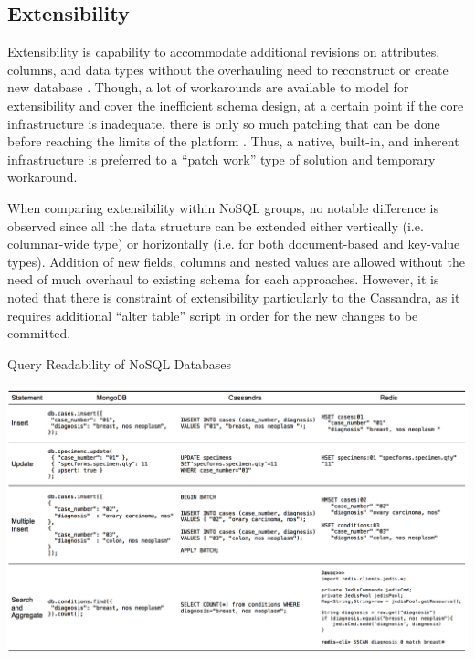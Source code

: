 \documentclass[5p]{elsarticle}
\begin{document}
\subsection{Extensibility}
Extensibility is capability to accommodate additional revisions on attributes, columns, and data types 
without the overhauling need to reconstruct or create new database \cite{S.Wang2013268}. 
Though, a lot of workarounds are available to model for extensibility and cover the inefficient schema design, 
at a certain point if the core infrastructure is inadequate, there is only so much patching that can be done before reaching the limits of the platform \cite{N.Ramachandran2016}.
Thus, a native, built-in, and inherent infrastructure is preferred to a “patch work” type of solution and temporary workaround.

When comparing extensibility within NoSQL groups, no notable difference is observed since all the data structure can be extended either 
vertically (i.e. columnar-wide type) or horizontally (i.e. for both document-based and key-value types). 
Addition of new fields, columns and nested values are allowed without the need of much overhaul to existing schema for each approaches. 
However, it is noted that there is constraint of extensibility particularly to the Cassandra, as it requires additional 
“alter table” script in order for the new changes to be committed.

\begin{table}[ht]
    \centering
    \caption{Query Readability of NoSQL Databases}
    \includegraphics[width=18.5cm,keepaspectratio]{Query}
    \label{fig.Query}
\end{table}
\end{document}
